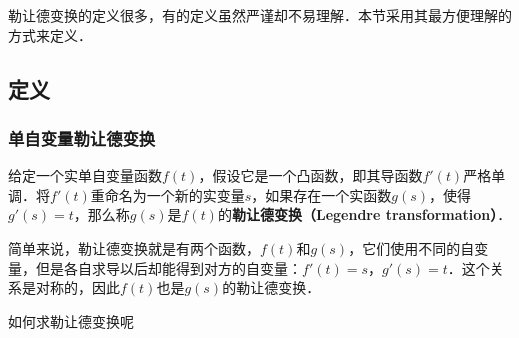 

勒让德变换的定义很多，有的定义虽然严谨却不易理解．本节采用其最方便理解的方式来定义．

\subsection{定义}

\subsubsection{单自变量勒让德变换}
\begin{definition}{}
给定一个实单自变量函数$f(t)$，假设它是一个凸函数，即其导函数$f'(t)$严格单调．将$f'(t)$重命名为一个新的实变量$s$，如果存在一个实函数$g(s)$，使得$g'(s)=t$，那么称$g(s)$是$f(t)$的\textbf{勒让德变换（Legendre transformation）}．
\end{definition}

简单来说，勒让德变换就是有两个函数，$f(t)$和$g(s)$，它们使用不同的自变量，但是各自求导以后却能得到对方的自变量：$f'(t)=s$，$g'(s)=t$．这个关系是对称的，因此$f(t)$也是$g(s)$的勒让德变换．

如何求勒让德变换呢


